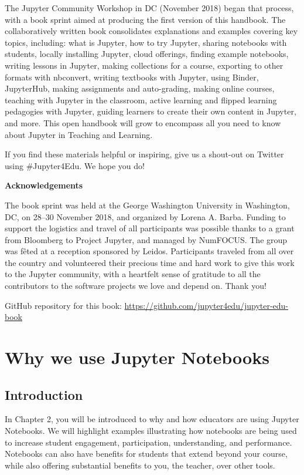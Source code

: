 \documentclass[]{book}
\begin{document}
The Jupyter Community Workshop in DC (November 2018) began that process,
with a book sprint aimed at producing the first version of this
handbook. The collaboratively written book consolidates explanations and
examples covering key topics, including: what is Jupyter, how to try
Jupyter, sharing notebooks with students, locally installing Jupyter,
cloud offerings, finding example notebooks, writing lessons in Jupyter,
making collections for a course, exporting to other formats with
nbconvert, writing textbooks with Jupyter, using Binder, JupyterHub,
making assignments and auto-grading, making online courses, teaching
with Jupyter in the classroom, active learning and flipped learning
pedagogies with Jupyter, guiding learners to create their own content in
Jupyter, and more. This open handbook will grow to encompass all you
need to know about Jupyter in Teaching and Learning.

If you find these materials helpful or inspiring, give us a shout-out on
Twitter using \#Jupyter4Edu. We hope you do!

\textbf{Acknowledgements}

The book sprint was held at the George Washington University in
Washington, DC, on 28--30 November 2018, and organized by Lorena A.
Barba. Funding to support the logistics and travel of all participants
was possible thanks to a grant from Bloomberg to Project Jupyter, and
managed by NumFOCUS. The group was fêted at a reception sponsored by
Leidos. Participants traveled from all over the country and volunteered
their precious time and hard work to give this work to the Jupyter
community, with a heartfelt sense of gratitude to all the contributors
to the software projects we love and depend on. Thank you!

GitHub repository for this book:
\url{https://github.com/jupyter4edu/jupyter-edu-book}

\chapter{Why we use Jupyter
Notebooks}\label{why-we-use-jupyter-notebooks}

\section{Introduction}\label{introduction}

In Chapter 2, you will be introduced to why and how educators are using
Jupyter Notebooks. We will highlight examples illustrating how notebooks
are being used to increase student engagement, participation,
understanding, and performance. Notebooks can also have benefits for
students that extend beyond your course, while also offering substantial
benefits to you, the teacher, over other tools.
\end{document}

